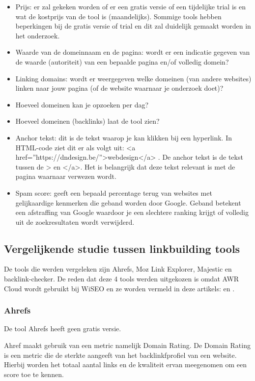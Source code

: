 \begin{itemize}
\item Prijs: er zal gekeken worden of er een gratis versie of een tijdelijke trial is en wat de kostprijs van de tool is (maandelijks). Sommige tools hebben beperkingen bij de gratis versie of trial en dit zal duidelijk gemaakt worden in het onderzoek.  
\item Waarde van de domeinnaam en de pagina: wordt er een indicatie gegeven van de waarde (autoriteit) van een bepaalde pagina en/of volledig domein? 
\item Linking domains: wordt er weergegeven welke domeinen (van andere websites) linken naar jouw pagina (of de website waarnaar je onderzoek doet)?
\item Hoeveel domeinen kan je opzoeken per dag?
\item Hoeveel domeinen (backlinks) laat de tool zien?
\item Anchor tekst: dit is de tekst waarop je kan klikken bij een hyperlink. In HTML-code ziet dit er als volgt uit: <a href=”https://dndesign.be/”>webdesign</a> . De anchor tekst is de tekst tussen de > en </a>. Het is belangrijk dat deze tekst relevant is met de pagina waarnaar verwezen wordt. 
\item Spam score: geeft een bepaald percentage terug van websites met gelijkaardige kenmerken die geband worden door Google. Geband betekent een afstraffing van Google waardoor je een slechtere ranking krijgt of volledig uit de zoekresultaten wordt verwijderd. 
\end{itemize}

\subsection{Vergelijkende studie tussen linkbuilding tools}
\label{ch: Vergelijkende studie tussen linkbuilding tools}

De tools die werden vergeleken zijn Ahrefs, Moz Link Explorer, Majestic en backlink-checker. De reden dat deze 4 tools werden uitgekozen is omdat AWR Cloud wordt gebruikt bij WiSEO en ze worden vermeld in deze artikels: \textcite{SEO13} en \textcite{SEOCOMPLETE}.  

\subsubsection{Ahrefs}
\label{ch: Ahrefs}
De tool Ahrefs heeft geen gratis versie. 

Ahref maakt gebruik van een metric namelijk Domain Rating. De Domain Rating is een metric die de sterkte aangeeft van het backlinkfprofiel van een website. Hierbij worden het totaal aantal links en de kwaliteit ervan meegenomen om een score toe te kennen. 

